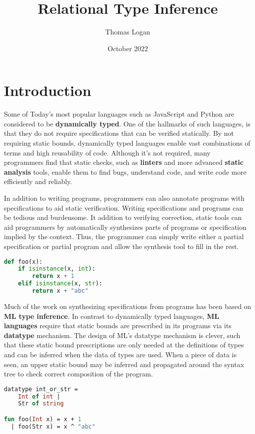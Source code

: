\documentclass[sigplan]{acmart}
\title{Relational Type Inference}
\author{Thomas Logan}
\date{October 2022}
\theoremstyle{definition}
\begin{document}
\maketitle

\section{Introduction}
Some of Today's most popular languages such as JavaScript and Python are considered to be \textbf{dynamically typed}.
One of the hallmarks of such languages, is that they do not require specifications 
that can be verified statically. By not requiring static bounds, dynamically typed languages
enable vast combinations of terms and high reusability of code. 
Although it's not required, many programmers find that
static checks, such as \textbf{linters} and more advanced \textbf{static analysis} tools, 
enable them to find bugs, understand code, and write code more efficiently and reliably. 

In addition to writing programs, programmers can also annotate programs with specifications to
aid static verification. Writing specifications and programs can be tedious and burdensome.  
It addition to verifying correction, static tools can aid programmers by automatically synthesizes
parts of programs or specification implied by the context. Thus, the programmer can simply write
either a partial specification or partial program and allow the synthesis tool to fill in the rest.   

\begin{lstlisting}[language=Python]
def foo(x):
    if isinstance(x, int):
        return x + 1 
    elif isinstance(x, str): 
        return x + "abc"
\end{lstlisting}

Much of the work on synthesizing specifications from programs has been based on \textbf{ML type inference}.
In contrast to dynamically typed languages, \textbf{ML languages} require that static bounds are prescribed 
in its programs via its \textbf{datatype} mechanism. The design of ML's datatype mechanism is clever, 
such that these static bound prescriptions are only needed at the definitions of types and can be 
inferred when the data of types are used. When a piece of data is seen, an upper static bound 
may be inferred and propagated around the syntax tree to check correct composition of the program.

\begin{lstlisting}[language=ML]
datatype int_or_str = 
    Int of int | 
    Str of string

fun foo(Int x) = x + 1
  | foo(Str x) = x ^ "abc"
\end{lstlisting}
\end{document}
